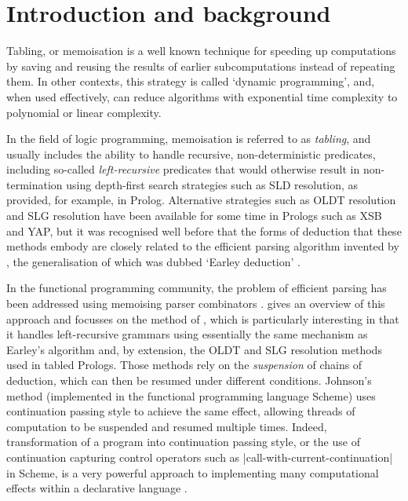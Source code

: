 
\section{Introduction and background}

Tabling, or memoisation \citep{Michie1968} is a well known technique for speeding up computations
by saving and reusing the results of earlier subcomputations instead of repeating
them. In other contexts, this strategy is called `dynamic programming', and, when
used effectively, can reduce algorithms with exponential time complexity to polynomial
or linear complexity. 

In the field of logic programming, memoisation is referred to as \emph{tabling},
and usually includes the ability to handle recursive, non-deterministic predicates, including
so-called \emph{left-recursive} predicates that would otherwise result in non-termination using 
depth-first search strategies
such as SLD resolution, as provided, for example, in Prolog. Alternative strategies
such as OLDT resolution \citep{TamakiSato1986} and SLG resolution \citep{ChenWarren1993} have
been available for some time in Prologs such as XSB and YAP, but it was recognised
well before that the forms of deduction that these methods embody are closely related to
the efficient parsing algorithm invented by \cite{Earley1970}, the generalisation of which
was dubbed `Earley deduction' \citep{Warren1975,PereiraWarren1983,Porter1986}.

In the functional programming community, the problem of efficient parsing has been
addressed using memoising parser combinators \citep{Norvig1991,Leermakers1993}.
\cite{Abdallah2017a} gives an overview of this approach and focusses on the method of
\cite{Johnson1995}, which is particularly
interesting in that it handles left-recursive grammars using essentially the same 
mechanism as Earley's algorithm and, by extension, the OLDT and SLG resolution methods
used in tabled Prologs. Those methods rely on the \emph{suspension} of chains of deduction,
which can then be resumed under different conditions. Johnson's method (implemented in the
functional programming language Scheme) uses continuation
passing style \citep{SussmanSteele1975} to achieve the same effect, allowing threads of
computation to be suspended and resumed multiple times. Indeed, transformation of a program
into continuation passing style, or the use of continuation capturing control operators
such as |call-with-current-continuation| in Scheme, is a very powerful approach
to implementing many computational effects within a declarative language \cite{Filinski1999}.

